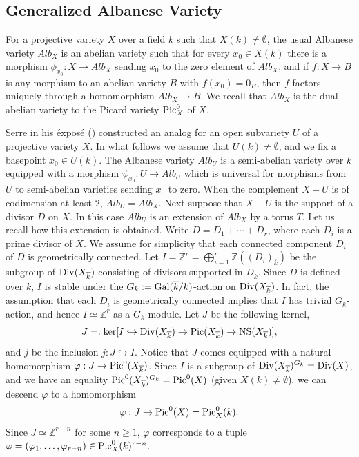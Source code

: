 \documentclass[12pt]{amsart}
\theoremstyle{remark}
\newcommand{\Z}{{\mathbb Z}}
\renewcommand{\1}{{\mathbb{S}}}
\newcommand{\Pic}{{\rm Pic}}
\newcommand{\Div}{{\rm Div}}
\newcommand{\Gal}{{\rm Gal}}
\newcommand{\NS}{{\operatorname{NS}}}
\newcommand{\<}{\langle}
\renewcommand{\>}{\rangle}
\begin{document}
\subsection{Generalized Albanese Variety}\label{genalbsection} For a  projective variety $X$ over a field $k$ such that $X(k)\neq\emptyset$, the usual Albanese variety $Alb_X$ is an abelian variety such that for every $x_0\in X(k)$ there is a morphism $\phi_{x_0}:X\to Alb_X$ sending $x_0$ to the zero element of $Alb_X$, and if $f:X\to B$ is any morphism to an abelian variety $B$ with $f(x_0)=0_B$, then $f$ factors uniquely through a homomorphism $Alb_X\to B$. We recall that $Alb_X$ is the dual abelian variety to the Picard variety $\Pic^0_X$ of $X$. 
	
Serre in his \'{e}xpos\'{e} (\cite{Se}) constructed an analog for an open subvariety $U$ of a projective variety $X$. In what follows we assume that $U(k)\neq\emptyset$, and we fix a basepoint $x_0\in U(k)$. The Albanese variety $Alb_U$ is a semi-abelian variety over $k$ equipped with a morphism $\psi_{x_0}:U\to Alb_U$ which is universal for morphisms from $U$ to semi-abelian varieties sending $x_0$ to zero.
When the complement $X-U$ is of codimension at least $2$,  $Alb_U=Alb_X$. 
Next suppose that $X-U$ is the support of a divisor $D$ on $X$. In this case $Alb_U$ is an extension of $Alb_X$ by a torus $T$. Let us recall how this extension is obtained. Write $D=D_1+\cdots+D_r$, where each $D_i$ is a prime divisor of $X$. We assume for simplicity that each connected component $D_i$ of $D$ is geometrically connected. Let 
$\displaystyle I=\Z^r=\bigoplus_{i=1}^r\Z((D_i)_{\overline{k}})$ be the subgroup of $\Div(X_{\overline{k}})$ consisting of divisors supported in $D_{\overline{k}}$. Since $D$ is defined over $k$, $I$ is stable under the $G_k:=\Gal(\overline{k}/k)$-action on $\Div(X_{\overline{k}})$. In fact, the assumption that each $D_i$ is geometrically connected implies that $I$ has trivial $G_k$-action, and hence $I\simeq\Z^r$ as a $G_k$-module.  
Let $J$ be the following kernel, 
\[J=:\ker[I\hookrightarrow \Div(X_{\overline{k}})\to \Pic(X_{\overline{k}})\to \NS(X_{\overline{k}})],\]
and $j$ be the inclusion $j:J\hookrightarrow I$. Notice that $J$ comes equipped with a natural homomorphism $\varphi:J\to\Pic^0(X_{\overline{k}})$. Since $I$ is a subgroup of $\Div(X_{\overline{k}})^{G_k}=\Div(X)$, and we have an equality $\Pic^0(X_{\overline{k}})^{G_k}=\Pic^0(X)$ (given $X(k)\neq\emptyset$), 
we can descend $\varphi$ to a homomorphism \[\varphi:J\to\Pic^0(X)=\Pic^0_X(k).\] 
Since $J\simeq\Z^{r-n}$ for some $n\geq 1$, $\varphi$ corresponds to a tuple $\varphi=(\varphi_1,\ldots, \varphi_{r-n})\in\Pic^0_X(k)^{r-n}$. 
\end{document}
